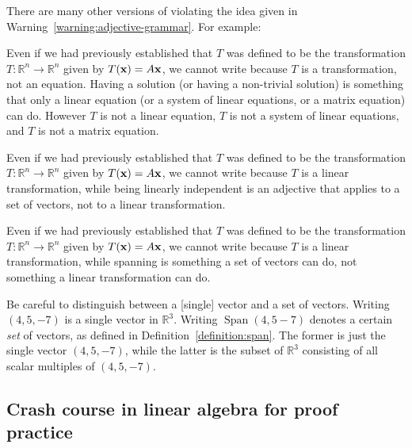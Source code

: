\documentclass{book}
\theoremstyle{ekimcustom}
\begin{document}
There are many other versions of violating the idea given in Warning~\ref{warning:adjective-grammar}. For example:
\begin{bwarning}{}{}
Even if we had previously established that $T$ was defined to be the transformation $T : \mathbb{R}^n \to \mathbb{R}^n$ given by $T({\bf x}) = A{\bf x}$, we cannot write  because $T$ is a transformation, not an equation. Having a solution (or having a non-trivial solution) is something that only a linear equation (or a system of linear equations, or a matrix equation) can do. However $T$ is not a linear equation, $T$ is not a system of linear equations, and $T$ is not a matrix equation.
\end{bwarning}
\begin{bwarning}{}{}
Even if we had previously established that $T$ was defined to be the transformation $T : \mathbb{R}^n \to \mathbb{R}^n$ given by $T({\bf x}) = A{\bf x}$, we cannot write  because $T$ is a linear transformation, while being linearly independent is an adjective that applies to a set of vectors, not to a linear transformation.
\end{bwarning}
\begin{bwarning}{}{}
Even if we had previously established that $T$ was defined to be the transformation $T : \mathbb{R}^n \to \mathbb{R}^n$ given by $T({\bf x}) = A{\bf x}$, we cannot write  because $T$ is a linear transformation, while spanning is something a set of vectors can do, not something a linear transformation can do.
\end{bwarning}

\begin{bwarning}{}{}
Be careful to distinguish between a [single] vector and a set of vectors. Writing $(4,5,-7)$ is a single vector in $\mathbb{R}^3$. Writing $\operatorname{Span} (4,5-7)$ denotes a certain \emph{set} of vectors, as defined in Definition~\ref{definition:span}. The former is just the single vector $(4,5,-7)$, while the latter is the subset of $\mathbb{R}^3$ consisting of all scalar multiples of $(4,5,-7)$.
\end{bwarning}

\subsection{Crash course in linear algebra for proof practice}
\end{document}
